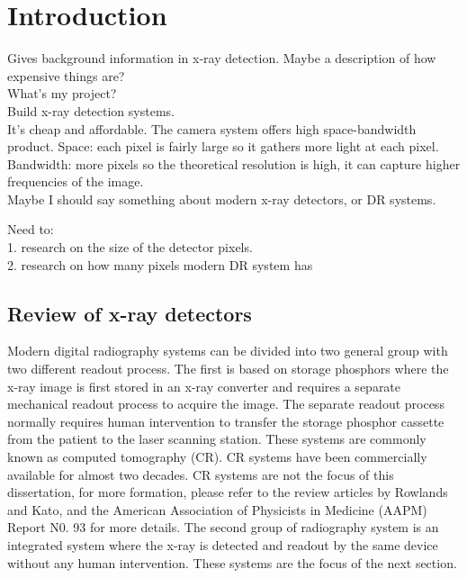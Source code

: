 \chapter{Introduction}
Gives background information in x-ray detection. Maybe a description of how expensive things are? \\
What's my project?\\
	Build x-ray detection systems.\\
	It's cheap and affordable.  The camera system offers high space-bandwidth product.  Space: each pixel is fairly large so it gathers more light at each pixel. Bandwidth: more pixels so the theoretical resolution is high, it can capture higher frequencies of the image.\\
	Maybe I should say something about modern x-ray detectors, or DR systems.
	
	
Need to:\\
	1. research on the size of the detector pixels.\\
	2. research on how many pixels modern DR system has\\


\section{Review of x-ray detectors}
Modern digital radiography systems can be divided into two general group with two different readout process.  The first is based on storage phosphors where the x-ray image is first stored in an x-ray converter and requires a separate mechanical readout process to acquire the image.  The separate readout process normally requires human intervention to transfer the storage phosphor cassette from the patient to the laser scanning station.  These systems are commonly known as computed tomography (CR).  CR systems have been commercially available for almost two decades.  CR systems are not the focus of this dissertation, for more formation, please refer to the review articles by Rowlands\cite{Rowlands2002} and Kato\cite{kato1994}, and the American Association of Physicists in Medicine (AAPM) Report N0. 93 for more details\cite{AAPM93}. The second group of radiography system is an integrated system where the x-ray is detected and readout by the same device without any human intervention.  These systems are the focus of the next section.

